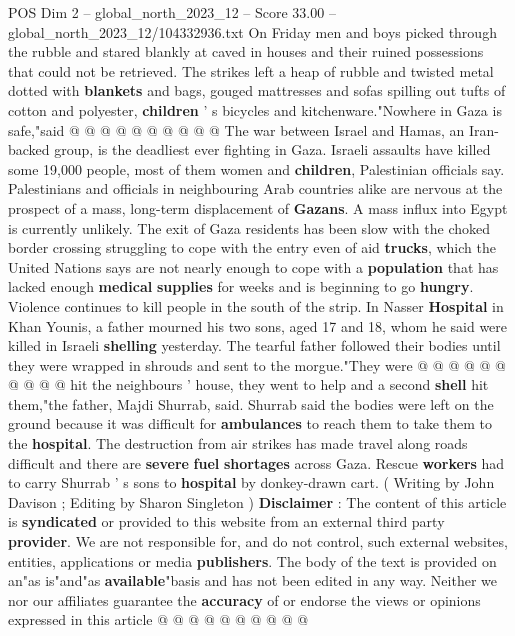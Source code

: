 \begin{textsample}{POS Dim 2 – global\_north\_2023\_12 – Score 33.00 – global\_north\_2023\_12/104332936.txt}
On Friday men and boys picked through the rubble and stared blankly at caved in houses and their ruined possessions that could not be retrieved.
The strikes left a heap of rubble and twisted metal dotted with \textbf{blankets} and bags, gouged mattresses and sofas spilling out tufts of cotton and polyester, \textbf{children} ' s bicycles and kitchenware."Nowhere in Gaza is safe,"said @ @ @ @ @ @ @ @ @ @ The war between Israel and Hamas, an Iran-backed group, is the deadliest ever fighting in Gaza.
Israeli assaults have killed some 19,000 people, most of them women and \textbf{children}, Palestinian officials say.
Palestinians and officials in neighbouring Arab countries alike are nervous at the prospect of a mass, long-term displacement of \textbf{Gazans}.
A mass influx into Egypt is currently unlikely.
The exit of Gaza residents has been slow with the choked border crossing struggling to cope with the entry even of aid \textbf{trucks}, which the United Nations says are not nearly enough to cope with a \textbf{population} that has lacked enough \textbf{medical} \textbf{supplies} for weeks and is beginning to go \textbf{hungry}.
Violence continues to kill people in the south of the strip.
In Nasser \textbf{Hospital} in Khan Younis, a father mourned his two sons, aged 17 and 18, whom he said were killed in Israeli \textbf{shelling} yesterday.
The tearful father followed their bodies until they were wrapped in shrouds and sent to the morgue."They were @ @ @ @ @ @ @ @ @ @ hit the neighbours ' house, they went to help and a second \textbf{shell} hit them,"the father, Majdi Shurrab, said.
Shurrab said the bodies were left on the ground because it was difficult for \textbf{ambulances} to reach them to take them to the \textbf{hospital}.
The destruction from air strikes has made travel along roads difficult and there are \textbf{severe} \textbf{fuel} \textbf{shortages} across Gaza.
Rescue \textbf{workers} had to carry Shurrab ' s sons to \textbf{hospital} by donkey-drawn cart. ( Writing by John Davison ; Editing by Sharon Singleton ) \textbf{Disclaimer} : The content of this article is \textbf{syndicated} or provided to this website from an external third party \textbf{provider}.
We are not responsible for, and do not control, such external websites, entities, applications or media \textbf{publishers}.
The body of the text is provided on an"as is"and"as \textbf{available}"basis and has not been edited in any way.
Neither we nor our affiliates guarantee the \textbf{accuracy} of or endorse the views or opinions expressed in this article @ @ @ @ @ @ @ @ @ @

\end{textsample}
